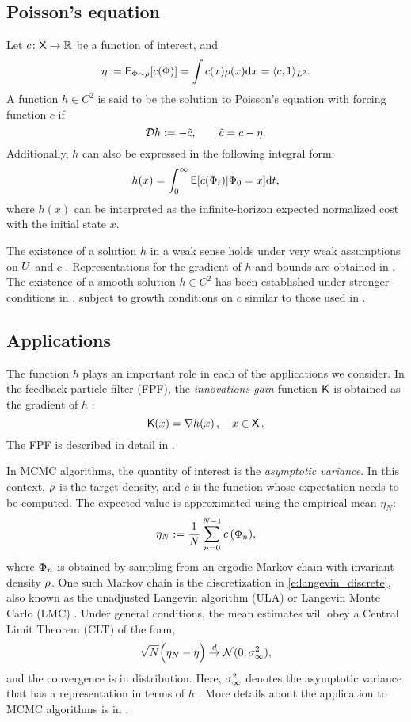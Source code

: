 \subsection{Poisson's equation}
Let $c \colon {\sf X} \to \mathbb{R}$ be a function of interest, and 
\[
\eta := {\sf E}_{\Phi \sim \rho}[c(\Phi)] =  \int c(x) \rho(x) \text{d} x = \langle c, 1 \rangle_{L^2}.
\]
A function $h\in C^2$ is said to be the solution to Poisson's equation with forcing function $c$ if
\begin{equation}
\generate h := - \tilc, \qquad  \tilc = c - \eta.
\label{e:poissons}
\end{equation}
Additionally, $h$ can also be expressed in the following integral form:
\begin{equation}
h(x) =\int_0^\infty {\sf E}[\tilde c(\Phi_t)|\Phi_0 = x] \text{d} t,
\end{equation}
where $h(x)$ can be interpreted as the infinite-horizon expected normalized cost with the initial state $x$. 

The existence of a solution $h$ in a weak sense holds under very weak assumptions on $U$ and $c$  \cite{glymey96a,konmey12a}.   Representations for the gradient of $h$ and bounds are obtained in \cite{laumehmeyrag15,devkonmey17b}.   The existence of  a  smooth solution $h\in C^2$ has been established under stronger conditions in \cite{parver01}, subject to growth conditions on $c$ similar to those used in  \cite{glymey96a}. 

\subsection{Applications} 
The function $h$ plays an important role in each of the applications we consider. In the feedback particle filter (FPF), the \textit{innovations gain} function $\text{\sf K}$ is obtained as  the gradient of $h$ \cite{yanmehmey13}:
\begin{equation}
\kFPF (x) = \nabla h(x)\, ,  \quad x\in\state\, .
\label{e:fpfgain}
\end{equation}
The FPF is described in detail in .

In MCMC algorithms, the quantity of interest is the \textit{asymptotic variance}. In this context, $\rho$ is the target density, and $c$ is the function whose expectation needs to be computed. The expected value is approximated using the empirical mean $\eta_N$:
\[ \eta_N := \frac{1}{N} \sum_{n=0}^{N-1} c\,(\Phi_n),\]
where $\Phi_n$ is obtained by sampling from an ergodic Markov chain with invariant density $\rho$. One such Markov chain is the discretization in \eqref{e:langevin_discrete}, also known as the unadjusted Langevin algorithm (ULA) or Langevin Monte Carlo (LMC) \cite{}. Under general conditions, the mean estimates will obey a Central Limit Theorem (CLT) of the form,
\[
\sqrt{N} \Bigl( \eta_N - \eta \Bigr) \overset{d}{\to} \mathcal{N}(0,\sigma_\infty ^2),
\]
and the convergence is in distribution. Here, $\sigma_\infty^2$ denotes the asymptotic variance that has a representation in terms of $h$ \cite{glymey96a,MT,asmgly07}. More details about the application to MCMC algorithms is in . 

